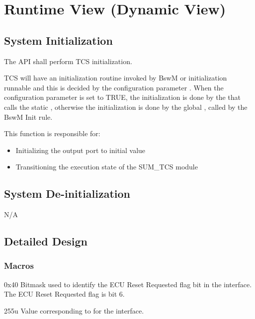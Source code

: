 \chapter{Runtime View (Dynamic View)}

\section{System Initialization}
\label{sec:system_initialization}
{The API shall perform TCS initialization.}
{}

{TCS will have an initialization routine invoked by BswM or initialization runnable and this is decided by the configuration parameter . 
When the configuration parameter is set to TRUE, the initialization is done by the   that calls the static  , otherwise the initialization is done by the global  , called by the BswM Init rule.}
{ }

{
{}{}{}
{}
{This function is responsible for:
\begin{itemize}
\item Initializing the output port to initial value
\item Transitioning the execution state of the SUM_TCS module
\end{itemize}
}
}
{}

\section{System De-initialization}
N/A

\section{Detailed Design}

\subsection{Macros}
\label{sec:macros}

{
{0x40}
{Bitmask used to identify the ECU Reset Requested flag bit in the  interface.
The ECU Reset Requested flag is bit 6.}}
{}

{
{255u}
{Value corresponding to  for the  interface.}}
{}


